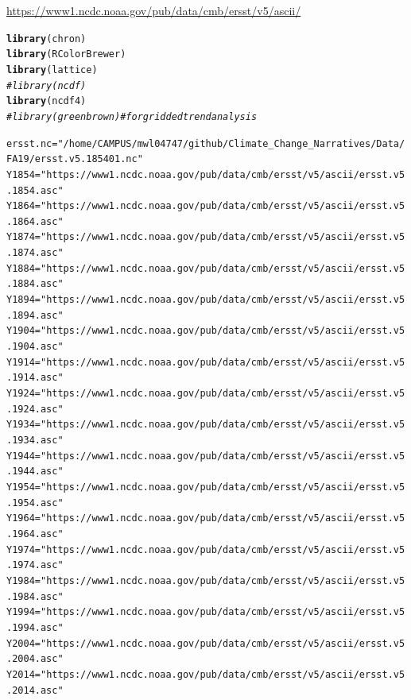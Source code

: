 \documentclass{article}\usepackage[]{graphicx}\usepackage[]{xcolor}
\makeatletter
\newcommand{\hlstr}[1]{\textcolor[rgb]{0.192,0.494,0.8}{#1}}%
\newcommand{\hlcom}[1]{\textcolor[rgb]{0.678,0.584,0.686}{\textit{#1}}}%
\newcommand{\hlstd}[1]{\textcolor[rgb]{0.345,0.345,0.345}{#1}}%
\newcommand{\hlkwb}[1]{\textcolor[rgb]{0.69,0.353,0.396}{#1}}%
\newcommand{\hlkwd}[1]{\textcolor[rgb]{0.737,0.353,0.396}{\textbf{#1}}}%
\newenvironment{kframe}{%
 \def\at@end@of@kframe{}%
 \ifinner\ifhmode%
  \def\at@end@of@kframe{\end{minipage}}%
  \begin{minipage}{\columnwidth}%
 \fi\fi%
 \def\FrameCommand##1{\hskip\@totalleftmargin \hskip-\fboxsep
 \colorbox{shadecolor}{##1}\hskip-\fboxsep
     \hskip-\linewidth \hskip-\@totalleftmargin \hskip\columnwidth}%
 \MakeFramed {\advance\hsize-\width
   \@totalleftmargin\z@ \linewidth\hsize
   \@setminipage}}%
 {\par\unskip\endMakeFramed%
 \at@end@of@kframe}
\newenvironment{knitrout}{}{} %
\makeatother
\begin{document}
\url{https://www1.ncdc.noaa.gov/pub/data/cmb/ersst/v5/ascii/}


\begin{knitrout}
\color{fgcolor}\begin{kframe}
\begin{alltt}
\hlkwd{library}\hlstd{(chron)}
\hlkwd{library}\hlstd{(RColorBrewer)}
\hlkwd{library}\hlstd{(lattice)}
\hlcom{#library(ncdf)}
\hlkwd{library}\hlstd{(ncdf4)}
\hlcom{#library(greenbrown) # for gridded trend analysis}

\hlstd{ersst.nc} \hlkwb{=} \hlstr{"/home/CAMPUS/mwl04747/github/Climate_Change_Narratives/Data/FA19/ersst.v5.185401.nc"}
\hlstd{Y1854} \hlkwb{=} \hlstr{"https://www1.ncdc.noaa.gov/pub/data/cmb/ersst/v5/ascii/ersst.v5.1854.asc"}
\hlstd{Y1864} \hlkwb{=} \hlstr{"https://www1.ncdc.noaa.gov/pub/data/cmb/ersst/v5/ascii/ersst.v5.1864.asc"}
\hlstd{Y1874} \hlkwb{=} \hlstr{"https://www1.ncdc.noaa.gov/pub/data/cmb/ersst/v5/ascii/ersst.v5.1874.asc"}
\hlstd{Y1884} \hlkwb{=} \hlstr{"https://www1.ncdc.noaa.gov/pub/data/cmb/ersst/v5/ascii/ersst.v5.1884.asc"}
\hlstd{Y1894} \hlkwb{=} \hlstr{"https://www1.ncdc.noaa.gov/pub/data/cmb/ersst/v5/ascii/ersst.v5.1894.asc"}
\hlstd{Y1904} \hlkwb{=} \hlstr{"https://www1.ncdc.noaa.gov/pub/data/cmb/ersst/v5/ascii/ersst.v5.1904.asc"}
\hlstd{Y1914} \hlkwb{=} \hlstr{"https://www1.ncdc.noaa.gov/pub/data/cmb/ersst/v5/ascii/ersst.v5.1914.asc"}
\hlstd{Y1924} \hlkwb{=} \hlstr{"https://www1.ncdc.noaa.gov/pub/data/cmb/ersst/v5/ascii/ersst.v5.1924.asc"}
\hlstd{Y1934} \hlkwb{=} \hlstr{"https://www1.ncdc.noaa.gov/pub/data/cmb/ersst/v5/ascii/ersst.v5.1934.asc"}
\hlstd{Y1944} \hlkwb{=} \hlstr{"https://www1.ncdc.noaa.gov/pub/data/cmb/ersst/v5/ascii/ersst.v5.1944.asc"}
\hlstd{Y1954} \hlkwb{=} \hlstr{"https://www1.ncdc.noaa.gov/pub/data/cmb/ersst/v5/ascii/ersst.v5.1954.asc"}
\hlstd{Y1964} \hlkwb{=} \hlstr{"https://www1.ncdc.noaa.gov/pub/data/cmb/ersst/v5/ascii/ersst.v5.1964.asc"}
\hlstd{Y1974} \hlkwb{=} \hlstr{"https://www1.ncdc.noaa.gov/pub/data/cmb/ersst/v5/ascii/ersst.v5.1974.asc"}
\hlstd{Y1984} \hlkwb{=} \hlstr{"https://www1.ncdc.noaa.gov/pub/data/cmb/ersst/v5/ascii/ersst.v5.1984.asc"}
\hlstd{Y1994} \hlkwb{=} \hlstr{"https://www1.ncdc.noaa.gov/pub/data/cmb/ersst/v5/ascii/ersst.v5.1994.asc"}
\hlstd{Y2004} \hlkwb{=} \hlstr{"https://www1.ncdc.noaa.gov/pub/data/cmb/ersst/v5/ascii/ersst.v5.2004.asc"}
\hlstd{Y2014} \hlkwb{=} \hlstr{"https://www1.ncdc.noaa.gov/pub/data/cmb/ersst/v5/ascii/ersst.v5.2014.asc"}


\end{alltt}
\end{kframe}
\end{knitrout}
\end{document}
